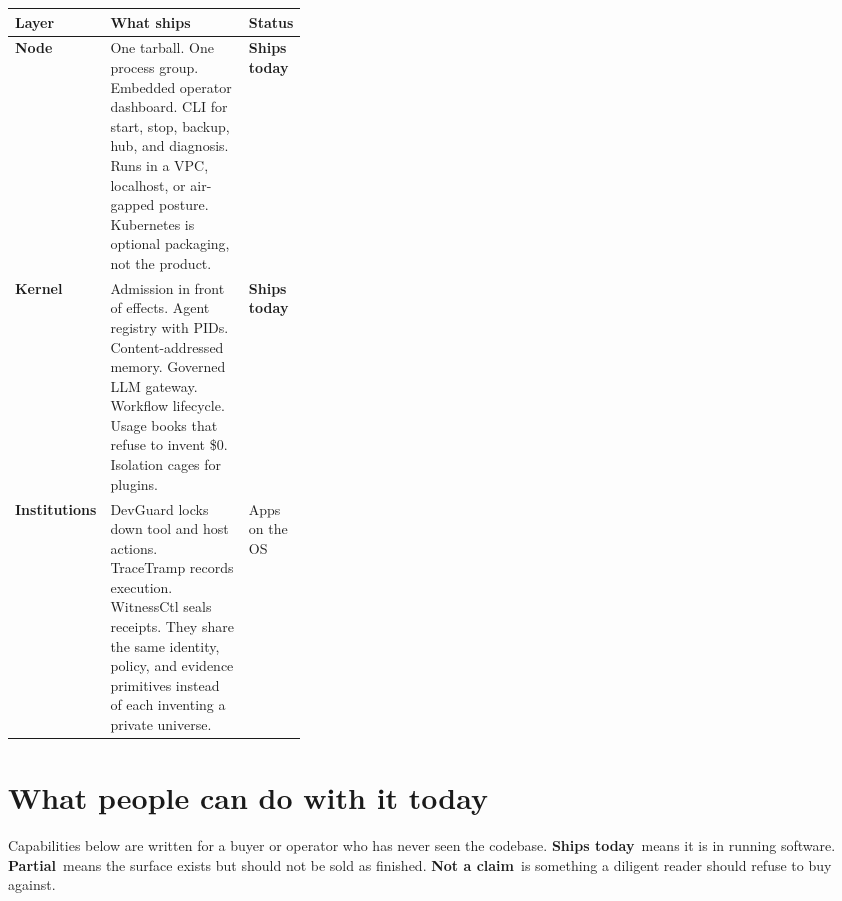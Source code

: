 \documentclass[10pt]{article}
\newcommand{\ships}{\textcolor{ships}{\textbf{Ships today}}}
\newcommand{\partialm}{\textcolor{partial}{\textbf{Partial}}}
\newcommand{\noclaim}{\textcolor{noclaim}{\textbf{Not a claim}}}
\begin{document}
\vspace{0.35em}
\renewcommand{\arraystretch}{1.18}
{\small
\begin{tabularx}{\linewidth}{@{}>{\bfseries\arraybackslash}p{0.18\linewidth} X >{\raggedright\arraybackslash}p{0.16\linewidth}@{}}
\toprule
Layer & What ships & Status \\
\midrule
Node & One tarball. One process group. Embedded operator dashboard. CLI for start, stop, backup, hub, and diagnosis. Runs in a VPC, localhost, or air-gapped posture. Kubernetes is optional packaging, not the product. & \ships \\
Kernel & Admission in front of effects. Agent registry with PIDs. Content-addressed memory. Governed LLM gateway. Workflow lifecycle. Usage books that refuse to invent \$0. Isolation cages for plugins. & \ships \\
Institutions & DevGuard locks down tool and host actions. TraceTramp records execution. WitnessCtl seals receipts. They share the same identity, policy, and evidence primitives instead of each inventing a private universe. & Apps on the OS \\
\bottomrule
\end{tabularx}}

\section{What people can do with it today}

Capabilities below are written for a buyer or operator who has never seen the codebase. \ships\ means it is in running software. \partialm\ means the surface exists but should not be sold as finished. \noclaim\ is something a diligent reader should refuse to buy against.
\end{document}
